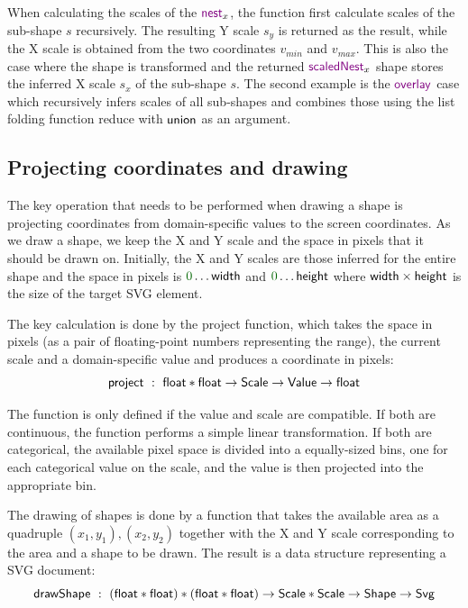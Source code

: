\documentclass{jfp}
\newcommand{\num}[1]{\textcolor{numclr}{#1}}
\newcommand{\ident}[1]{\textnormal{\textcolor{idclr}{\sffamily #1}}}
\newcommand{\kvd}[1]{\textnormal{\textcolor{kvdclr}{\sffamily #1}}}
\begin{document}
\vspace{-0.5em}
\noindent
When calculating the scales of the $\kvd{nest}_x$, the function first calculate scales of the
sub-shape $s$ recursively. The resulting Y scale $s_y$ is returned as the result, while the X
scale is obtained from the two coordinates $v_{min}$ and $v_{max}$. This is also the case where
the shape is transformed and the returned $\kvd{scaledNest}_x$ shape stores the inferred X scale
$s_x$ of the sub-shape $s$. The second example is the $\kvd{overlay}$ case which recursively
infers scales of all sub-shapes and combines those using the list folding function
\ident{reduce} with $\ident{union}$ as an argument.

\subsection{Projecting coordinates and drawing}
The key operation that needs to be performed when drawing a shape is projecting coordinates from
domain-specific values to the screen coordinates. As we draw a shape, we keep the X and Y scale
and the space in pixels that it should be drawn on. Initially, the X and Y scales are those
inferred for the entire shape and the space in pixels is $\num{0}\ldots\ident{width}$ and
$\num{0}\ldots\ident{height}$ where $\ident{width}\times\ident{height}$ is the size of the target
SVG element.

The key calculation is done by the \ident{project} function, which takes the space in pixels (as a
pair of floating-point numbers representing the range), the current scale and a domain-specific value
and produces a coordinate in pixels:
%
\begin{equation*}
\ident{project}~:~\ident{float}*\ident{float}\rightarrow \ident{Scale}\rightarrow\ident{Value} \rightarrow \ident{float}
\end{equation*}

\vspace{-1.25em}
\noindent
The function is only defined if the value and scale are compatible. If both are continuous, the
function performs a simple linear transformation. If both are categorical, the available pixel
space is divided into a equally-sized bins, one for each categorical value on the scale, and the
value is then projected into the appropriate bin.

The drawing of shapes is done by a function that takes the available area as a quadruple $(x_1, y_1), (x_2, y_2)$
together with the X and Y scale corresponding to the area and a shape to be drawn. The result is
a data structure representing a SVG document:
%
\begin{equation*}
\ident{drawShape}~:~(\ident{float}*\ident{float})*(\ident{float}*\ident{float}) \rightarrow \ident{Scale}*\ident{Scale}\rightarrow\ident{Shape}\rightarrow\ident{Svg}
\end{equation*}
\end{document}
